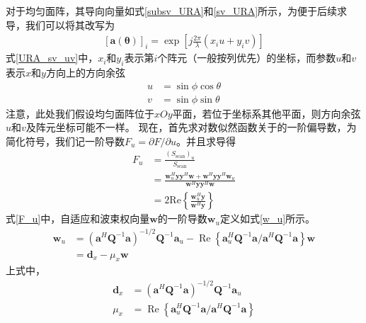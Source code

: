 \documentclass[master]{thesis-uestc}
\begin{document}
对于均匀面阵，其导向向量如式\eqref{subsv_URA}和\eqref{sv_URA}所示，为便于后续求导，我们可以将其改写为
\begin{equation}\label{URA_sv_uv}
    \begin{aligned}
        \left[\bm{a}(\bm{\theta})\right]_i = \exp\left[j\frac{2\pi}{\lambda}(x_iu+y_iv)\right]
    \end{aligned}
\end{equation}
式\eqref{URA_sv_uv}中，$x_i$和$y_i$表示第$i$个阵元（一般按列优先）的坐标，而参数$u$和$v$表示$x$和$y$方向上的方向余弦
\begin{subequations}\label{uv_def}
    \begin{align}
        u &= \sin\phi\cos\theta \\
        v &= \sin\phi\sin\theta
    \end{align}
\end{subequations}
注意，此处我们假设均匀面阵位于$xOy$平面，若位于坐标系其他平面，则方向余弦$u$和$v$及阵元坐标可能不一样。
现在，首先求对数似然函数关于的一阶偏导数，为简化符号，我们记一阶导数$F_u=\partial F/\partial u$。并且求导得
\begin{equation}\label{F_u}
    \begin{aligned}
        F_u &= \frac{(S_\mathrm{scan})_u}{S_\mathrm{scan}} \\
            &= \frac{\bm{w}^H_u\bm{y}\bm{y}^H\bm{w} + \bm{w}^H\bm{y}\bm{y}^H\bm{w}_u}{\bm{w}^H\bm{y}\bm{y}^H\bm{w}} \\
            &= 2\mathrm{Re}\left\{\frac{\bm{w}^H_u\bm{y}}{\bm{w}^H\bm{y}}\right\}
    \end{aligned}
\end{equation}
式\eqref{F_u}中，自适应和波束权向量$\bm{w}$的一阶导数$\bm{w}_u$定义如式\eqref{w_u}所示。
\begin{equation}\label{w_u}
    \begin{aligned}
        \bm{w}_{u} &=\left(\bm{a}^{H} \bm{Q}^{-1} \bm{a}\right)^{-1 / 2} 
        \bm{Q}^{-1} \bm{a}_{u}-\operatorname{Re}
        \left\{\bm{a}_{u}^{H} \bm{Q}^{-1} \bm{a} / 
        \bm{a}^{H} \bm{Q}^{-1} \bm{a}\right\} \bm{w} \\
        &=\bm{d}_{x}-\mu_{x} \bm{w}
    \end{aligned}
\end{equation}
上式中，
\begin{subequations}\label{dx_nd_mu}
    \begin{align}
        \bm{d}_{x}&=\left(\bm{a}^{H} \bm{Q}^{-1} \bm{a}\right)^{-1 / 2}\bm{Q}^{-1} \bm{a}_{u} \\
        \mu_x&=\operatorname{Re}\left\{\bm{a}_{u}^{H} \bm{Q}^{-1} \bm{a} / \bm{a}^{H} \bm{Q}^{-1} \bm{a}\right\}
    \end{align}
\end{subequations}
\end{document}
